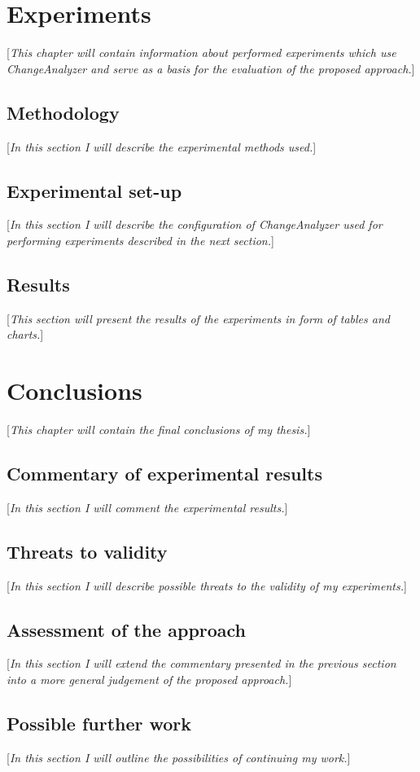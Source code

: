 \documentclass{pracamgr}
\begin{document}
\chapter{Experiments}
\label{cha:experiments}
[\textit{This chapter will contain information about performed experiments which use ChangeAnalyzer and serve as a basis for the evaluation of the proposed approach.}]

\section{Methodology}
\label{sec:methodology}
[\textit{In this section I will describe the experimental methods used.}]

\section{Experimental set-up}
\label{sec:set-up}
[\textit{In this section I will describe the configuration of ChangeAnalyzer used for performing experiments described in the next section.}]

\section{Results}
\label{sec:results}
[\textit{This section will present the results of the experiments in form of tables and charts.}]

\chapter{Conclusions}
\label{cha:conclusions}
[\textit{This chapter will contain the final conclusions of my thesis.}]

\section{Commentary of experimental results}
\label{sec:commentary}
[\textit{In this section I will comment the experimental results.}]

\section{Threats to validity}
\label{sec:threats}
[\textit{In this section I will describe possible threats to the validity of my experiments.}]

\section{Assessment of the approach}
\label{sec:assessment}
[\textit{In this section I will extend the commentary presented in the previous section into a more general judgement of the proposed approach.}]

\section{Possible further work}
\label{sec:further_work}
[\textit{In this section I will outline the possibilities of continuing my work.}]

\printbibliography[heading=bibintoc]
\end{document}
